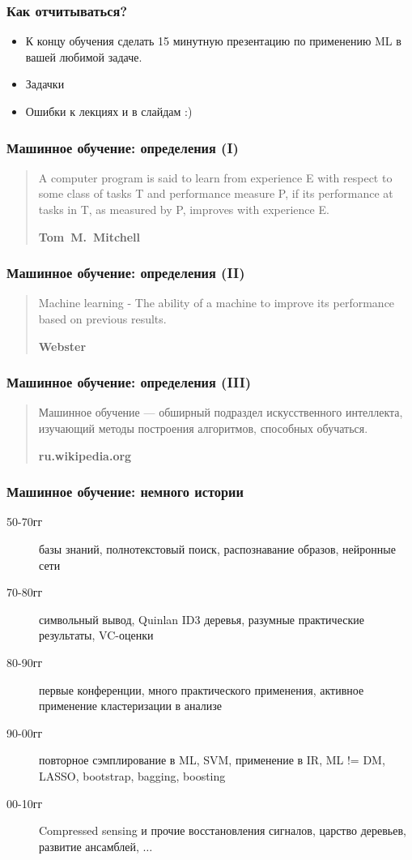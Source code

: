 \documentclass[14pt, fleqn, xcolor={dvipsnames, table}]{beamer}
\begin{document}
\begin{frame}
\frametitle{Как отчитываться?}
\begin{itemize}
\item К концу обучения сделать 15 минутную презентацию по применению ML в вашей любимой задаче.
\item Задачки
\item Ошибки к лекциях и в слайдам :)
\end{itemize}
\end{frame}


\begin{frame}
\frametitle{Машинное обучение: определения (I)}
\begin{quote}
A computer program is said to learn from experience E with respect to some class of tasks T and performance measure P, if its performance at tasks in T, as measured by P, improves with experience E.
\begin{flushright}\textbf{Tom~M.~Mitchell}\end{flushright}
\end{quote}
\end{frame}
\begin{frame}
\frametitle{Машинное обучение: определения (II)}
\begin{quote}
Machine learning - The ability of a machine to improve its performance based on previous results.
\begin{flushright}\textbf{Webster}\end{flushright}
\end{quote}
\end{frame}
\begin{frame}
\frametitle{Машинное обучение: определения (III)}
\begin{quote}
Машинное обучение — обширный подраздел искусственного интеллекта, изучающий методы построения алгоритмов, способных обучаться.
\begin{flushright}\textbf{ru.wikipedia.org}\end{flushright}
\end{quote}
\end{frame}

\begin{frame}
\frametitle{Машинное обучение: немного истории}
\begin{small}
\begin{description}
	\item[50-70гг] базы знаний, полнотекстовый поиск, распознавание образов, нейронные сети
	\item[70-80гг] символьный вывод, Quinlan ID3 деревья, разумные практические результаты, VC-оценки
	\item[80-90гг] первые конференции, много практического применения, активное применение кластеризации в анализе
	\item[90-00гг] повторное сэмплирование в ML, SVM, применение в IR, ML != DM, LASSO, bootstrap, bagging, boosting
	\item[00-10гг] Compressed sensing и прочие восстановления сигналов, царство деревьев, развитие ансамблей, $\ldots$
\end{description}
\end{small}
\end{frame}
\end{document}
